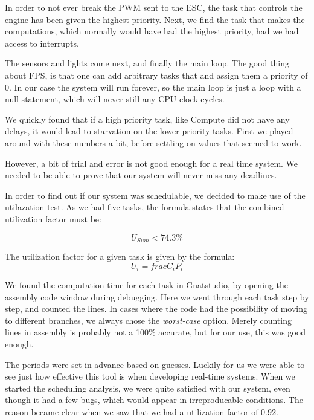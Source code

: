 \documentclass{article}
\begin{document}
In order to not ever break the PWM sent to the ESC, the task that controls the engine has been given the highest priority. Next, we find the task that makes the computations, which normally would have had the highest priority, had we had access to interrupts.

The sensors and lights come next, and finally the main loop. The good thing about FPS, is that one can add arbitrary tasks that and assign them a priority of 0. In our case the system will run forever, so the main loop is just a loop with a null statement, which will never still any CPU clock cycles.

We quickly found that if a high priority task, like Compute did not have any delays, it would lead to starvation on the lower priority tasks. First we played around with these numbers a bit, before settling on values that seemed to work.

However, a bit of trial and error is not good enough for a real time system. We needed to be able to prove that our system will never miss any deadlines.

In order to find out if our system was schedulable, we decided to make use of the utilazation test. As we had five tasks, the formula states that the combined utilization factor must be:

\begin{equation*}
  U_{Sum} < 74.3\%
\end{equation*}

The utilization factor for a given task is given by the formula:
\begin{equation*}
  U_{i} = frac{C_{i}}{P_{i}}
\end{equation*}

We found the computation time for each task in Gnatstudio, by opening the assembly code window during debugging. Here we went through each task step by step, and counted the lines. In cases where the code had the possibility of moving to different branches, we always chose the \textit{worst-case} option. Merely counting lines in assembly is probably not a 100\% accurate, but for our use, this was good enough.

The periods were set in advance based on guesses. Luckily for us we were able to see just how effective this tool is when developing real-time systems. When we started the scheduling analysis, we were quite satisfied with our system, even though it had a few bugs, which would appear in irreproducable conditions. The reason became clear when we saw that we had a utilization factor of 0.92.
\end{document}
